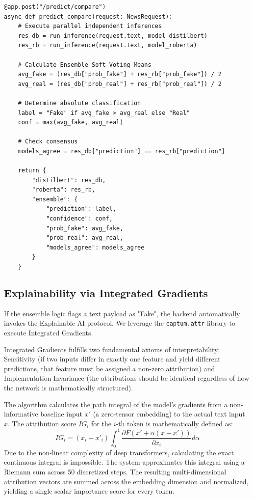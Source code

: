 \documentclass[conference]{IEEEtran}
\begin{document}
\begin{lstlisting}[caption={FastAPI Ensemble Routing Logic}, label={lst:ensemble}]
@app.post("/predict/compare")
async def predict_compare(request: NewsRequest):
    # Execute parallel independent inferences
    res_db = run_inference(request.text, model_distilbert)
    res_rb = run_inference(request.text, model_roberta)

    # Calculate Ensemble Soft-Voting Means
    avg_fake = (res_db["prob_fake"] + res_rb["prob_fake"]) / 2
    avg_real = (res_db["prob_real"] + res_rb["prob_real"]) / 2
    
    # Determine absolute classification
    label = "Fake" if avg_fake > avg_real else "Real"
    conf = max(avg_fake, avg_real)
    
    # Check consensus
    models_agree = res_db["prediction"] == res_rb["prediction"]

    return {
        "distilbert": res_db,
        "roberta": res_rb,
        "ensemble": {
            "prediction": label,
            "confidence": conf,
            "prob_fake": avg_fake,
            "prob_real": avg_real,
            "models_agree": models_agree
        }
    }
\end{lstlisting}

\subsection{Explainability via Integrated Gradients}
If the ensemble logic flags a text payload as "Fake", the backend automatically invokes the Explainable AI protocol. We leverage the \texttt{captum.attr} library to execute Integrated Gradients.

Integrated Gradients fulfills two fundamental axioms of interpretability: Sensitivity (if two inputs differ in exactly one feature and yield different predictions, that feature must be assigned a non-zero attribution) and Implementation Invariance (the attributions should be identical regardless of how the network is mathematically structured). 

The algorithm calculates the path integral of the model's gradients from a non-informative baseline input $x'$ (a zero-tensor embedding) to the actual text input $x$. The attribution score $IG_i$ for the $i$-th token is mathematically defined as:
\begin{equation}
IG_i = (x_i - x'_i) \int_0^1 \frac{\partial F(x'+\alpha(x-x'))}{\partial x_i} d\alpha
\end{equation}
Due to the non-linear complexity of deep transformers, calculating the exact continuous integral is impossible. The system approximates this integral using a Riemann sum across 50 discretized steps. The resulting multi-dimensional attribution vectors are summed across the embedding dimension and normalized, yielding a single scalar importance score for every token.
\end{document}

